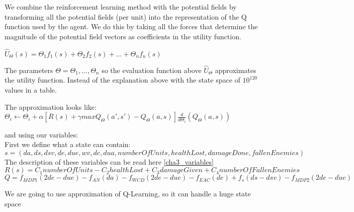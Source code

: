 We combine the reinforcement learning method with the potential fields by transforming all the potential fields (per unit) into the representation of the Q function used by the agent. We do this by taking all the forces that determine the magnitude of the potential field vectors as coefficients in the utility function.




$\hat{U}_\Theta(s) = \Theta_1 f_1(s) + \Theta_2 f_2(s) + ... + \Theta_n f_n(s) $

The parameters $\Theta = \Theta_1, ..., \Theta_n$ so the evaluation function above $\hat{U}_\Theta$ approximates the utility function. Instead of the explanation above with the state space of $10^{120}$ values in a table.

The approximation looks like:
$\Theta_i \leftarrow \Theta_i + \alpha [ R(s) + \gamma maxQ_\Theta(a',s')-Q_\Theta(a,s) ] \frac{d}{d\Theta_i}(Q_\Theta(a,s))$


and using our variables:\\
First we define what a state can contain:\\
$s = {(da, ds, dsv, de, due, wv, dc, dua, numberOfUnits, healthLost, damageDone, fallenEnemies)}$
The description of these variables can be read here \ref{cha3_variables}\\
$R(s) = C_1 numberOfUnits - C_2 healthLost +  C_3 damageGiven +  C_4 numberOfFallenEnemies$\\

$Q = f_{MDP1} (2de - due)-f_{AN}(da)-f_{WCD}(2de-due)-f_{EAC}(de)+f_s(ds-dsv)-f_{MDP2}(2de-due)$

We are going to use approximation of Q-Learning, so it can handle a huge state space


